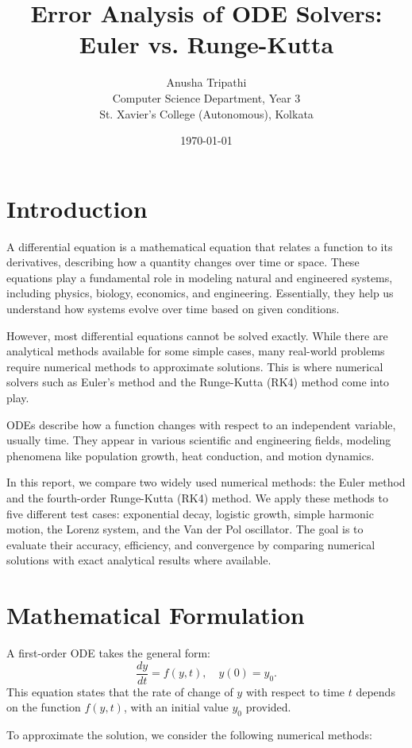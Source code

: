\documentclass{article}
\title{Error Analysis of ODE Solvers: Euler vs. Runge-Kutta}
\author{Anusha Tripathi \\
Computer Science Department, Year 3 \\
St. Xavier's College (Autonomous), Kolkata}
\date{\today}
\begin{document}
\maketitle

\section{Introduction}
A differential equation is a mathematical equation that relates a function to its derivatives, describing how a quantity changes over time or space. These equations play a fundamental role in modeling natural and engineered systems, including physics, biology, economics, and engineering. Essentially, they help us understand how systems evolve over time based on given conditions.

However, most differential equations cannot be solved exactly. While there are analytical methods available for some simple cases, many real-world problems require numerical methods to approximate solutions. This is where numerical solvers such as Euler’s method and the Runge-Kutta (RK4) method come into play.

ODEs describe how a function changes with respect to an independent variable, usually time. They appear in various scientific and engineering fields, modeling phenomena like population growth, heat conduction, and motion dynamics.

In this report, we compare two widely used numerical methods: the Euler method and the fourth-order Runge-Kutta (RK4) method. We apply these methods to five different test cases: exponential decay, logistic growth, simple harmonic motion, the Lorenz system, and the Van der Pol oscillator. The goal is to evaluate their accuracy, efficiency, and convergence by comparing numerical solutions with exact analytical results where available.

\section{Mathematical Formulation}
A first-order ODE takes the general form:
\begin{equation}
    \frac{dy}{dt} = f(y, t), \quad y(0) = y_0.
\end{equation}
This equation states that the rate of change of \( y \) with respect to time \( t \) depends on the function \( f(y,t) \), with an initial value \( y_0 \) provided.

To approximate the solution, we consider the following numerical methods:
\end{document}
